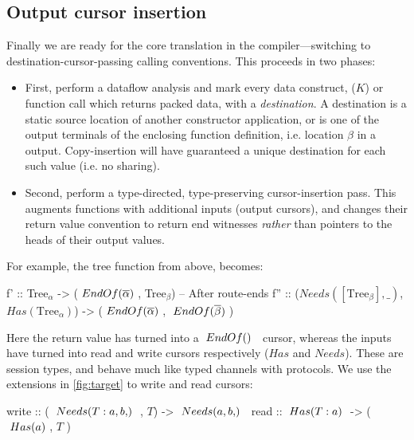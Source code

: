 \documentclass[a4paper,english]{lipics-v2016}
\newcommand{\fresh}[1]{\ensuremath{#1}}
\newcommand{\freshA}{\fresh{\alpha}}
\newcommand{\freshB}{\fresh{\beta}}
\newcommand{\locend}[1]{\ensuremath{\overline{#1}}}
\begin{document}
\subsection{Output cursor insertion}\label{sec:cursorize}

Finally we are ready for the core translation in the compiler---switching to
destination-cursor-passing calling conventions.  This proceeds in two phases:

\begin{itemize}
\item First, perform a dataflow analysis and mark every data construct, ($K$)
      or function call which returns packed data, with a {\em destination}.  A
      destination is a static source location of another constructor
      application, or is one of the output terminals of the enclosing function
      definition, i.e. location \freshB{} in a \il{Tree$_\freshB$} output.
      Copy-insertion will have guaranteed a unique destination for each such
      value (i.e. no sharing).
\item Second, perform a type-directed, type-preserving cursor-insertion pass.
  This augments functions with additional inputs (output cursors), and changes
  their return value convention to return end witnesses {\em rather} than
  pointers to the heads of their output values.
\end{itemize}

\noindent
For example, the tree function from above, becomes:
\begin{code}
  f'  :: Tree$_\freshA$ -> ($\ENDOF{\locend{\freshA}}$, Tree$_\freshB$) -- After route-ends
  f'' :: ($Needs([\text{Tree}_\freshB],\_)$, $Has(\text{Tree}_\freshA)$) -> ($\ENDOF{\locend{\freshA}}$, $\ENDOF{\locend{\freshB}}$)
\end{code}
%

Here the return value has turned into a $\ENDOF$ cursor, whereas the inputs have
turned into read and write cursors respectively ($Has$ and $Needs$).  These are session types, and
behave much like typed channels with protocols.  We use the extensions in
\cref{fig:target} to write and read cursors:

\begin{code}
  write :: ( $\NEEDS{T:a, b}$, $T$) ->  $\NEEDS{a,b}$
  read  :: $\; Has(T:a) \;$ ->   ( $\; Has(a) \;$, $T$ )
\end{code}
\end{document}
